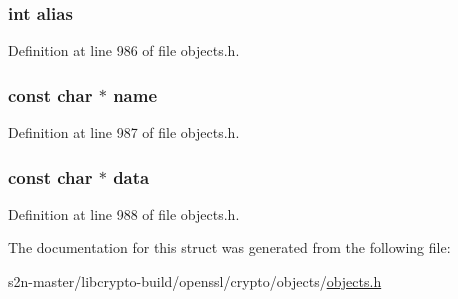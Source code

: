 \subsubsection[{\texorpdfstring{alias}{alias}}]{\setlength{\rightskip}{0pt plus 5cm}int alias}\hypertarget{structobj__name__st_a56f0b708d0bd5a42481fa2dc83a750d3}{}\label{structobj__name__st_a56f0b708d0bd5a42481fa2dc83a750d3}


Definition at line 986 of file objects.\+h.

\subsubsection[{\texorpdfstring{name}{name}}]{\setlength{\rightskip}{0pt plus 5cm}const char $\ast$ name}\hypertarget{structobj__name__st_afcd1706c9144e6d6eee6127661ae3be2}{}\label{structobj__name__st_afcd1706c9144e6d6eee6127661ae3be2}


Definition at line 987 of file objects.\+h.

\subsubsection[{\texorpdfstring{data}{data}}]{\setlength{\rightskip}{0pt plus 5cm}const char $\ast$ data}\hypertarget{structobj__name__st_ae4950db1dbfff8459a712737063b61aa}{}\label{structobj__name__st_ae4950db1dbfff8459a712737063b61aa}


Definition at line 988 of file objects.\+h.



The documentation for this struct was generated from the following file\+:\begin{DoxyCompactItemize}
\item 
s2n-\/master/libcrypto-\/build/openssl/crypto/objects/\hyperlink{crypto_2objects_2objects_8h}{objects.\+h}\end{DoxyCompactItemize}
